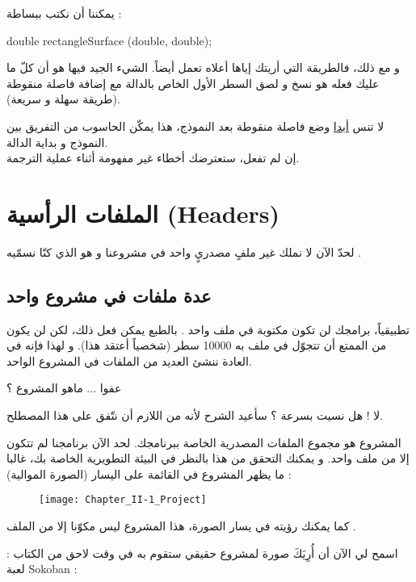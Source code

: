 يمكننا أن نكتب ببساطة :

\begin{Csource}
double rectangleSurface (double, double);
\end{Csource}

و مع ذلك، فالطريقة التي أريتك إياها أعلاه تعمل أيضاً. الشيء الجيد فيها هو أن كلّ ما عليك فعله هو نسخ و لصق السطر الأول الخاص بالدالة مع إضافة فاصلة منقوطة (طريقة سهلة و سريعة).

\begin{critical}
  لا تنس
\underline{أبدا}
وضع فاصلة منقوطة بعد النموذج، هذا يمكّن الحاسوب من التفريق بين النموذج و بداية الدالة.\\
إن لم تفعل، ستعترضك أخطاء غير مفهومة أثناء عملية الترجمة.
\end{critical}

\section{الملفات الرأسية (\textenglish{Headers})}

لحدّ الآن لا نملك غير ملفٍ مصدريٍ واحد في مشروعنا و هو الذي كنّا نسمّيه
.

\subsection{عدة ملفات في مشروع واحد}

تطبيقياً، برامجك لن تكون مكتوبة في ملف واحد
.
بالطبع يمكن فعل ذلك، لكن لن يكون من الممتع أن تتجوّل في ملف به 10000 سطر (شخصياً أعتقد هذا). و لهذا فإنه في العادة ننشئ العديد من الملفات في المشروع الواحد.
\begin{question}
  عفوا ... ماهو المشروع ؟
\end{question}
لا ! هل نسيت بسرعة ؟ سأعيد الشرح لأنه من اللازم أن نتّفق على هذا المصطلح.

المشروع هو مجموع الملفات المصدرية الخاصة ببرنامجك. لحد الآن برنامجنا لم تتكون إلا من ملف واحد. و يمكنك التحقق من هذا بالنظر في البيئة التطويرية الخاصة بك، غالبا ما يظهر المشروع في القائمة على اليسار (الصورة الموالية) :

\begin{figure}[H]
	\centering
	\texttt{[image: Chapter\_II-1\_Project]}
\end{figure}

كما يمكنك رؤيته في يسار الصورة، هذا المشروع ليس مكوّنا إلا من الملف
.

اسمح لي الآن أن أُرِيَكَ صورة لمشروع حقيقي ستقوم به في وقت لاحق من الكتاب : لعبة 
\textenglish{Sokoban} :

